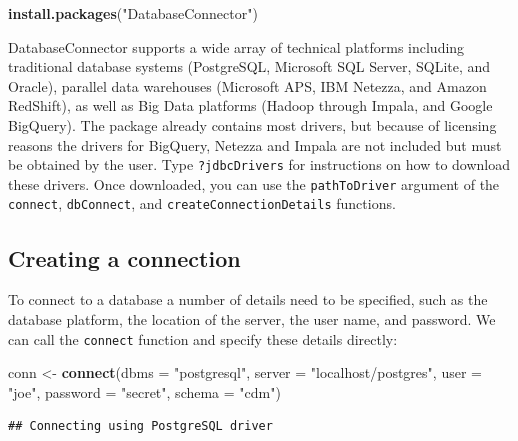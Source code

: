 \documentclass[11pt]{book}
\newenvironment{Shaded}{\begin{snugshade}}{\end{snugshade}}
\newcommand{\DataTypeTok}[1]{\textcolor[rgb]{0.13,0.29,0.53}{#1}}
\newcommand{\KeywordTok}[1]{\textcolor[rgb]{0.13,0.29,0.53}{\textbf{#1}}}
\newcommand{\NormalTok}[1]{#1}
\newcommand{\StringTok}[1]{\textcolor[rgb]{0.31,0.60,0.02}{#1}}
\theoremstyle{definition}
\theoremstyle{definition}
\theoremstyle{definition}
\theoremstyle{remark}
\begin{document}
\begin{Shaded}
\begin{Highlighting}[]
\KeywordTok{install.packages}\NormalTok{(}\StringTok{"DatabaseConnector"}\NormalTok{)}
\end{Highlighting}
\end{Shaded}

DatabaseConnector supports a wide array of technical platforms including traditional database systems (PostgreSQL, Microsoft SQL Server, SQLite, and Oracle), parallel data warehouses (Microsoft APS, IBM Netezza, and Amazon RedShift), as well as Big Data platforms (Hadoop through Impala, and Google BigQuery). The package already contains most drivers, but because of licensing reasons the drivers for BigQuery, Netezza and Impala are not included but must be obtained by the user. Type \texttt{?jdbcDrivers} for instructions on how to download these drivers. Once downloaded, you can use the \texttt{pathToDriver} argument of the \texttt{connect}, \texttt{dbConnect}, and \texttt{createConnectionDetails} functions.

\hypertarget{creating-a-connection}{%
\subsection{Creating a connection}\label{creating-a-connection}}

To connect to a database a number of details need to be specified, such as the database platform, the location of the server, the user name, and password. We can call the \texttt{connect} function and specify these details directly: 

\begin{Shaded}
\begin{Highlighting}[]
\NormalTok{conn <-}\StringTok{ }\KeywordTok{connect}\NormalTok{(}\DataTypeTok{dbms =} \StringTok{"postgresql"}\NormalTok{,}
                \DataTypeTok{server =} \StringTok{"localhost/postgres"}\NormalTok{,}
                \DataTypeTok{user =} \StringTok{"joe"}\NormalTok{,}
                \DataTypeTok{password =} \StringTok{"secret"}\NormalTok{,}
                \DataTypeTok{schema =} \StringTok{"cdm"}\NormalTok{)}
\end{Highlighting}
\end{Shaded}

\begin{verbatim}
## Connecting using PostgreSQL driver
\end{verbatim}
\end{document}
